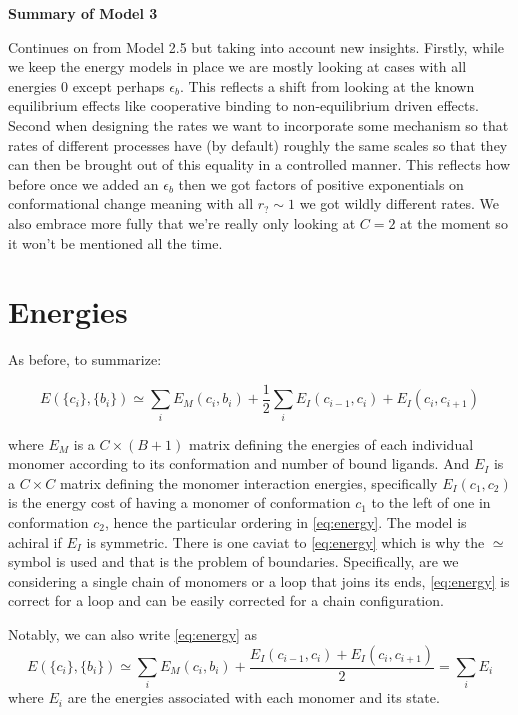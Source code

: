 \documentclass[11pt]{article}
\newcommand\set[1]{\ensuremath{\{#1\}}}
\begin{document}
\begin{center}
	\LARGE
	\textbf{Summary of Model 3}
	\vspace{1em}
\end{center}

Continues on from Model 2.5 but taking into account new insights.
Firstly, while we keep the energy models in place we are mostly looking at cases with all energies 0 except perhaps $\epsilon_b$.
This reflects a shift from looking at the known equilibrium effects like cooperative binding to non-equilibrium driven effects.
Second when designing the rates we want to incorporate some mechanism so that rates of different processes have (by default) roughly the same scales so that they can then be brought out of this equality in a controlled manner.
This reflects how before once we added an $\epsilon_b$ then we got factors of positive exponentials on conformational change meaning with all $r_? \sim 1$ we got wildly different rates.
We also embrace more fully that we're really only looking at $C=2$ at the moment so it won't be mentioned all the time.

\newpage
\section{Energies}\label{sec:energies}
As before, to summarize:
\begin{tcolorbox}
	\begin{equation}\label{eq:energy}
		E(\set{c_i}, \set{b_i}) \simeq \sum_i E_M(c_i, b_i) + \frac{1}{2} \sum_i E_I(c_{i-1}, c_i) + E_I(c_i, c_{i+1})
	\end{equation}
\end{tcolorbox}
where $E_M$ is a $C{\times}(B+1)$ matrix defining the energies of each individual monomer according to its conformation and number of bound ligands.
And $E_I$ is a $C{\times}C$ matrix defining the monomer interaction energies, specifically $E_I(c_1, c_2)$ is the energy cost of having a monomer of conformation $c_1$ to the left of one in conformation $c_2$, hence the particular ordering in \cref{eq:energy}.
The model is achiral if $E_I$ is symmetric.
There is one caviat to \cref{eq:energy} which is why the $\simeq$ symbol is used and that is the problem of boundaries.
Specifically, are we considering a single chain of monomers or a loop that joins its ends, \cref{eq:energy} is correct for a loop and can be easily corrected for a chain configuration.

Notably, we can also write \cref{eq:energy} as
\begin{equation}\label{eq:energy_ind}
	E(\set{c_i}, \set{b_i}) \simeq \sum_i E_M(c_i, b_i) + \frac{E_I(c_{i-1}, c_i) + E_I(c_i, c_{i+1})}{2} = \sum_i E_{i}
\end{equation}
where $E_i$ are the energies associated with each monomer and its state.
\end{document}
